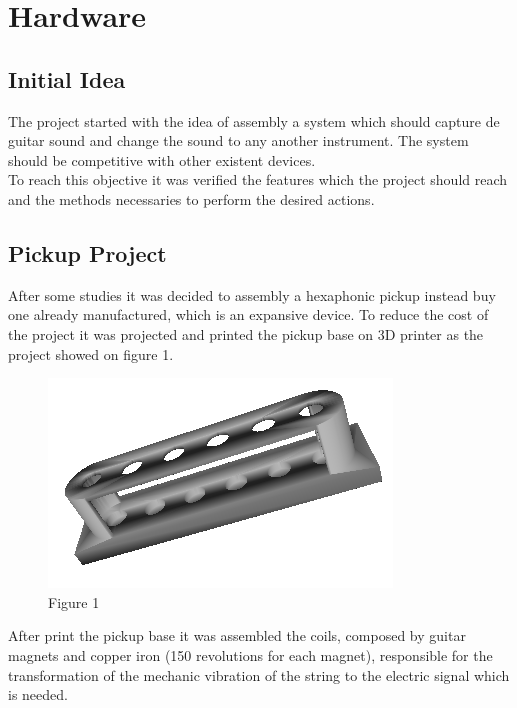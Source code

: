 \chapter{Hardware}
\section{Initial Idea}
The project started with the idea of assembly a system which should capture de guitar sound and change the sound to any another instrument. The system should be competitive with other existent devices.\\
To reach this objective it was verified the features which the project should reach and the methods necessaries to perform the desired actions.\\
\section{Pickup Project} 
After some studies it was decided to assembly a hexaphonic pickup instead buy one already manufactured, which is an expansive device. To reduce the cost of the project it was projected and printed the pickup base on 3D printer as the project showed on figure 1.

\begin{figure}[!htpb]
\centering
\includegraphics[scale=0.5]{textual-elements/hardware/Capt}
\caption{Figure 1}
\end{figure}

After print the pickup base it was assembled the coils, composed by guitar magnets and copper iron (150 revolutions for each magnet), responsible for the transformation of the mechanic vibration of the string to the electric signal which is needed.   

